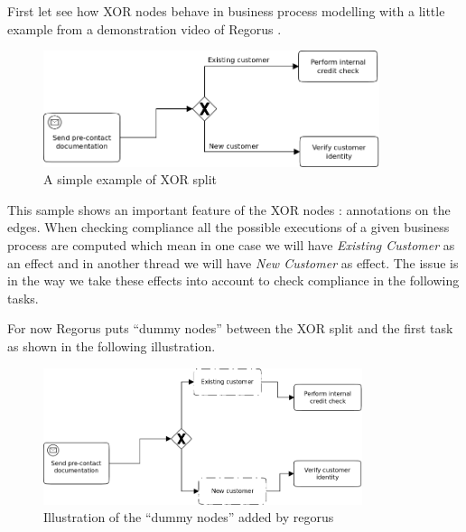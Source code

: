 \documentclass[10pt]{report}
\begin{document}
First let see how XOR nodes behave in business process modelling with a little example from a demonstration video of Regorus \autocite{regorusVid}.

\begin{figure}[!h] %
\begin{center}
\includegraphics[height=3.4cm]{XOR.png} %
\caption{A simple example of XOR split} %
\end{center}
\label{image_soleil} %
\end{figure} %

This sample shows an important feature of the XOR nodes : annotations on the edges. When checking compliance all the possible executions of a given business process are computed which mean in one case we will have \textit{Existing Customer} as an effect and in another thread we will have \textit{New Customer} as effect. The issue is in the way we take these effects into account to check compliance in the following tasks.

For now Regorus puts \enquote{dummy nodes} between the XOR split and the first task as shown in the following illustration.
\begin{figure}[!h] %
\begin{center}
\includegraphics[height=4cm]{XOR2.png} %
\caption{Illustration of the \enquote{dummy nodes} added by regorus} %
\end{center}
\label{image_soleil} %
\end{figure} %
\end{document}
